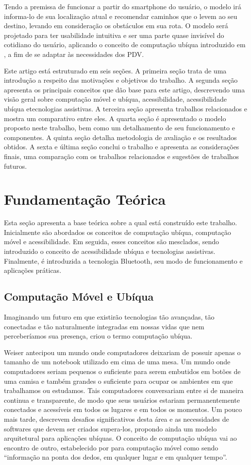 \documentclass[twoside,english,brazilian]{UNISINOSartigo}
\begin{document}
Tendo a premissa de funcionar a partir do smartphone do usuário, o modelo irá informa-lo de sua localização atual e recomendar caminhos que o levem ao seu destino, levando em consideração os obstáculos em sua rota. O modelo será projetado para ter usabilidade intuitiva e ser uma parte quase invisível do cotidiano do usuário, aplicando o conceito de computação ubíqua introduzido em , a fim de se adaptar às necessidades dos PDV.

Este artigo está estruturado em seis seções. A primeira seção trata de uma introdução a respeito das motivações e objetivos do trabalho. A segunda seção apresenta os principais conceitos que dão base para este artigo, descrevendo uma visão geral sobre computação móvel e ubíqua, acessibilidade, acessibilidade ubíqua etecnologias assistivas. A terceira seção apresenta trabalhos relacionados e mostra um comparativo entre eles. A quarta seção é apresentado o modelo proposto neste trabalho, bem como um detalhamento de seu funcionamento e componentes. A quinta seção detalha metodologia de avaliação e os resultados obtidos. A sexta e última seção conclui o trabalho e apresenta as considerações finais, uma comparação com os trabalhos relacionados e sugestões de trabalhos futuros.

\section{Fundamentação Teórica}
Esta seção apresenta a base teórica sobre a qual está construído este trabalho. Inicialmente são abordados os conceitos de computação ubíqua, computação móvel e acessibilidade. Em seguida, esses conceitos são mesclados, sendo introduzido o conceito de acessibilidade ubíqua e tecnologias assistivas. Finalmente, é introduzida a tecnologia Bluetooth, seu modo de funcionamento e aplicações práticas.

\subsection{Computação Móvel e Ubíqua}
Imaginando um futuro em que existirão tecnologias tão avançadas, tão conectadas e tão naturalmente integradas em nossas vidas que nem perceberíamos sua presença,  criou o termo computação ubíqua. 

Weiser antecipou um mundo onde computadores deixariam de possuir apenas o tamanho de um notebook utilizado em cima de uma mesa. Um mundo onde computadores seriam pequenos o suficiente para serem embutidos em botões de uma camisa e também grandes o suficiente para ocupar os ambientes em que trabalhamos ou estudamos. Tais computadores conversariam entre si de maneira continua e transparente, de modo que seus usuários estariam permanentemente conectados e acessíveis em todos os lugares e em todos os momentos. Um pouco mais tarde,  descrevem desafios significativos desta área e as necessidades de softwares que devem ser criados supera-los, propondo ainda um modelo arquitetural para aplicações ubíquas. O conceito de computação ubíqua vai ao encontro de outro, estabelecido por  para computação móvel como sendo “informação na ponta dos dedos, em qualquer lugar e em qualquer tempo”.
\end{document}
